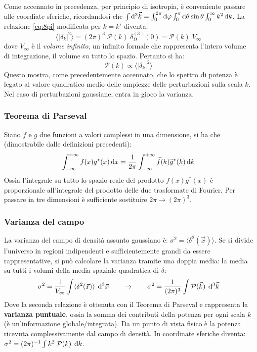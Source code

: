 Come accennato in precedenza, per principio di isotropia, è conveniente passare alle coordiate sferiche, ricordandosi che $\int \operatorname{d}\!{^3 \vec{k}}=\int_0^{2\pi}\operatorname{d}\!{\varphi}\int_0^\pi\operatorname{d}\!{\theta}\sin\theta\int_0^\infty k^2\operatorname{d}\!{k}$. La relazione \ref{eq:8pi} modificata per $k=k'$ diventa:
\begin{equation*}
    \langle | \delta_k |^2 \rangle = (2\pi)^3 \; \mathcal{P}(k) \; \delta_D^{(3)}(0) = \mathcal{P}(k) \; V_\infty 
\end{equation*}
dove $V_\infty$ è il \textit{volume infinito}, un infinito formale che rappresenta l'intero volume di integrazione, il volume su tutto lo spazio. Pertanto si ha:
$$
\mathcal{P}(k)  \propto \langle | \delta_k|^2 \rangle
$$
Questo mostra, come precedentemente accennato, che lo spettro di potenza è legato al valore quadratico medio delle ampiezze delle perturbazioni sulla scala $k$. Nel caso di perturbazioni gaussiane, entra in gioco la varianza. 

\subsubsection*{Teorema di Parseval}
Siano $f$ e $g$ due funzioni a valori complessi in una dimensione, si ha che (dimostrabile dalle definizioni precedenti):
\begin{equation*}
    \int^{+\infty}_{-\infty} f(x)g^*(x)\operatorname{d}\!{x} = \frac{1}{2\pi} \int^{+\infty}_{-\infty} \widetilde{ f}(k)\widetilde{g}^*(k)\operatorname{d}\!{k}
\end{equation*}
Ossia l'integrale su tutto lo spazio reale del prodotto $f(x)g^*(x)$ è proporzionale all'integrale del prodotto delle due trasformate di Fourier. Per passare in tre dimensioni è sufficiente sostituire $2\pi\rightarrow (2\pi)^3$. 

\subsubsection*{Varianza del campo}
La varianza del campo di densità assunto gaussiano è: $\sigma^2 = \langle  \delta^2 (\vec{x}) \rangle$. Se si divide l'universo in regioni indipendenti e sufficientemente grandi da essere rappresentative, si può calcolare la varianza tramite una doppia media: la media su tutti i volumi della media spaziale quadratica di $\delta$:
\begin{equation*}
    \sigma^2 = \frac{1}{V_\infty} \int \langle  \delta^2 (\vec{x}) \rangle\; \operatorname{d}\!{^3\vec{x}} \qquad \rightarrow \qquad \sigma^2 = \frac{1}{(2\pi)^3} \int \mathcal{P}(\vec{k}) \; \operatorname{d}\!{^3\vec{k}}
\end{equation*}
Dove la seconda relazione è ottenuta con il Teorema di Parseval e rappresenta la \textbf{varianza puntuale}, ossia la somma dei contributi della potenza per ogni scala $k$ (è un'informazione globale/integrata). Da un punto di vista fisico è la potenza ricevuta complessivamente dal campo di densità. In coordinate sferiche diventa: $\sigma^2 =(2\pi)^{-1} \int  k^2\;\mathcal{P}(k)\; \operatorname{d}\!{k} $. 

